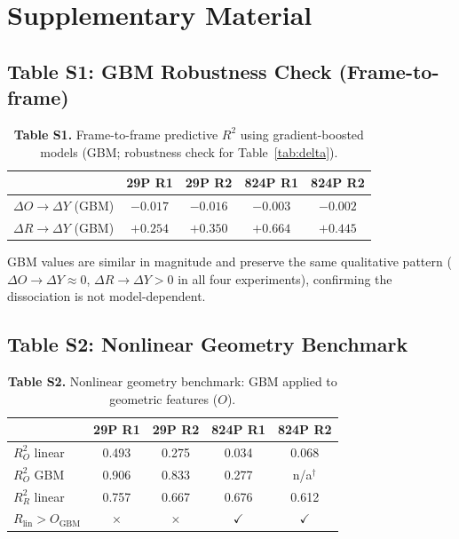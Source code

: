 \documentclass[11pt,a4paper]{article}
\begin{document}
\appendix
\section*{Supplementary Material}

\subsection*{Table S1: GBM Robustness Check (Frame-to-frame)}

\begin{table}[h]
\centering
\caption*{\textbf{Table S1.} Frame-to-frame predictive $R^2$ using gradient-boosted models (GBM; robustness check for Table~\ref{tab:delta}).}
\begin{tabular}{lcccc}
\toprule
 & 29P R1 & 29P R2 & 824P R1 & 824P R2 \\
\midrule
$\Delta O\!\rightarrow\!\Delta Y$ (GBM) & $-0.017$ & $-0.016$ & $-0.003$ & $-0.002$ \\
$\Delta R\!\rightarrow\!\Delta Y$ (GBM) & $+0.254$ & $+0.350$ & $+0.664$ & $+0.445$ \\
\bottomrule
\end{tabular}
\end{table}

GBM values are similar in magnitude and preserve the same qualitative pattern ($\Delta O\!\rightarrow\!\Delta Y \approx 0$, $\Delta R\!\rightarrow\!\Delta Y > 0$ in all four experiments), confirming the dissociation is not model-dependent.

\subsection*{Table S2: Nonlinear Geometry Benchmark}

\begin{table}[h]
\centering
\caption*{\textbf{Table S2.} Nonlinear geometry benchmark: GBM applied to geometric features ($O$).}
\begin{tabular}{lcccc}
\toprule
 & 29P R1 & 29P R2 & 824P R1 & 824P R2 \\
\midrule
$R^2_O$ linear & 0.493 & 0.275 & 0.034 & 0.068 \\
$R^2_O$ GBM   & 0.906 & 0.833 & 0.277 & n/a$^\dagger$ \\
$R^2_R$ linear & 0.757 & 0.667 & 0.676 & 0.612 \\
$R_\text{lin} > O_\text{GBM}$ & $\times$ & $\times$ & $\checkmark$ & $\checkmark$ \\
\bottomrule
\end{tabular}
\end{table}
\end{document}
